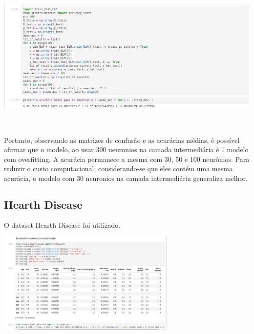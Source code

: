 \documentclass{article}
\begin{document}
\begin{center}
\begin{center}
\end{center}

\begin{center}

\includegraphics[height=3in]{Ex6/Breast_Cancer/acc_300.png}
\vspace{10pt}

\end{center}

Portanto, observando as matrizes de confusão e as acurácias médias, é possível afirmar que o modelo, ao usar 300 neuronios na camada intermediária é 1 modelo com overfitting. A acurácia permanece a mesma com 30, 50 e 100 neurônios. Para reduzir o custo computacional, considerando-se que eles contém uma mesma acurácia, o modelo com 30 neuronios na camada intermediária generaliza melhor.




\subsection{Hearth Disease}
O dataset Hearth Disease foi utilizado.

\begin{center}

\includegraphics[height=2in]{Ex6/Hearth_Disease/data_health.png}


\end{center}
\end{center}
\end{document}
